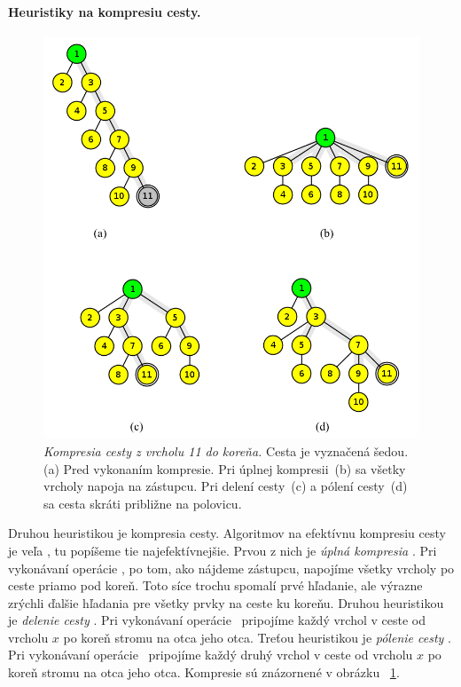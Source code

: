 \paragraph{Heuristiky na kompresiu cesty.}

\begin{figure}
\includegraphics[width=\columnwidth]{obrazky/komp.png}
\caption{\emph{Kompresia cesty z vrcholu 11 do koreňa.} 
Cesta je vyznačená šedou. 
(a) Pred vykonaním kompresie. Pri úplnej kompresii~(b) sa všetky vrcholy 
napoja na zástupcu. Pri delení cesty~(c) a pólení cesty~(d) sa cesta skráti 
približne na polovicu.} 
\label{img:komp} 
\end{figure}

Druhou heuristikou je kompresia cesty. Algoritmov na efektívnu kompresiu 
cesty je veľa \citep{paths2}, tu popíšeme tie najefektívnejšie. Prvou z nich 
je \emph{úplná kompresia} \citep{comp1}. Pri vykonávaní operácie \find, po tom, 
ako nájdeme zástupcu, napojíme všetky vrcholy po ceste priamo pod koreň. Toto 
síce trochu spomalí prvé hľadanie, ale výrazne zrýchli ďalšie hľadania pre
všetky prvky na ceste ku koreňu.
Druhou heuristikou je \emph{delenie cesty} \citep{comp2}. Pri vykonávaní 
operácie \find\ pripojíme každý vrchol v ceste od vrcholu $x$ po koreň stromu
na otca jeho otca. Treťou heuristikou je \emph{pólenie cesty} \citep{comp2}.
Pri vykonávaní operácie \find\  pripojíme každý druhý vrchol v ceste od vrcholu
$x$ po koreň stromu na otca jeho otca. Kompresie sú znázornené v obrázku~%
\ref{img:komp}.

